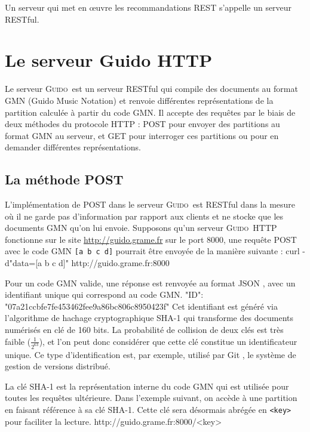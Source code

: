\documentclass{article}
\newenvironment{code}		{\vspace{-2mm} \fontsize{8.5pt}{12pt}\selectfont \verbatim}{\endverbatim\vspace{-2mm}}
\newenvironment{mcode}		{\vspace{-2mm} \fontsize{10pt}{12pt}\selectfont \verbatim}{\endverbatim\vspace{-2mm}}
\newcommand{\icode}[1]		{{\small \texttt{#1}}}
\newcommand{\guido}		{\textsc{Guido}}
\begin{document}
Un serveur qui met en \oe{}uvre les recommandations REST s'appelle un serveur RESTful.

\section{Le serveur Guido HTTP}\label{section:overview}

Le serveur \guido\ est un serveur RESTful qui compile des documents au format GMN (Guido Music Notation) et renvoie différentes représentations de la partition calculée à partir du code GMN. Il accepte des requêtes par le biais de deux méthodes du protocole HTTP : POST pour envoyer des partitions au format GMN au serveur, et GET pour interroger ces partitions ou pour en demander différentes représentations.

\subsection{La méthode POST}\label{subsection:post}
L'implémentation de POST dans le serveur \guido\ est RESTful dans la mesure où il ne garde pas d'information par rapport aux clients et ne stocke que les documents GMN qu'on lui envoie.
Supposons qu'un serveur \guido\ HTTP fonctionne sur le site \url{http://guido.grame.fr} sur le port 8000, une requête POST avec le code GMN \verb=[a b c d]= pourrait être envoyée de la manière suivante :
\begin{code}
 curl -d"data=[a b c d]" http://guido.grame.fr:8000
\end{code}

Pour un code GMN valide, une réponse est renvoyée au format JSON \cite{json}, avec un identifiant unique qui correspond au code GMN.
\begin{code}
{
  "ID": "07a21ccbfe7fe453462fee9a86bc806c8950423f"
}
\end{code}
Cet identifiant est généré via l'algorithme de hachage cryptographique SHA-1 \cite{sha1} qui transforme des documents numérisés en clé de 160 bits. La probabilité de collision de deux clés est très faible ($\frac{1}{2^{63}}$), et l'on peut donc considérer que cette clé constitue un identificateur unique. Ce type d'identification est, par exemple, utilisé par Git \cite{scott2009pro}, le système de gestion de versions distribué.

La clé SHA-1 est la représentation interne du code GMN qui est utilisée pour toutes les requêtes ultérieure. Dans l'exemple suivant, on accède à une partition en faisant référence à sa clé SHA-1. Cette clé sera désormais abrégée en \icode{<key>} pour faciliter la lecture.
\begin{mcode}
  http://guido.grame.fr:8000/<key>
\end{mcode}
\end{document}
